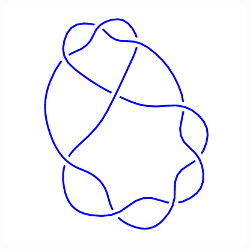 \begin{figure}[H]
\begin{minipage}[b]{.18\linewidth}
    \end{minipage}
    \begin{minipage}[b]{.18\linewidth}
        \centering
        \includegraphics[width=\linewidth]{../data/9_5.png}
    \end{minipage}
\end{figure}
